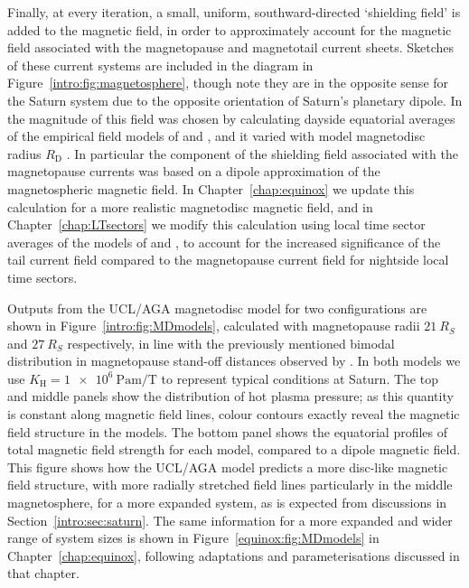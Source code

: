 Finally, at every iteration, a small, uniform, southward-directed `shielding field' is added to the magnetic field, in order to approximately account for the magnetic field associated with the magnetopause and magnetotail current sheets. Sketches of these current systems are included in the diagram in Figure~\ref{intro:fig:magnetosphere}, though note they are in the opposite sense for the Saturn system due to the opposite orientation of Saturn's planetary dipole. In \citet{achilleos2010a} the magnitude of this field was chosen by calculating dayside equatorial averages of the empirical field models of \citet{alexeev2005} and \citet{alexeev2006}, and it varied with model magnetodisc radius $R_\mathrm{D}$ \citep[see][Figure 6]{achilleos2010a}. In particular the component of the shielding field associated with the magnetopause currents was based on a dipole approximation of the magnetospheric magnetic field. In Chapter~\ref{chap:equinox} we update this calculation for a more realistic magnetodisc magnetic field, and in Chapter~\ref{chap:LTsectors} we modify this calculation using local time sector averages of the models of \citet{alexeev2005} and \citet{alexeev2006}, to account for the increased significance of the tail current field compared to the magnetopause current field for nightside local time sectors.

Outputs from the UCL/AGA magnetodisc model for two configurations are shown in Figure~\ref{intro:fig:MDmodels}, calculated with magnetopause radii $\SI{21}{R_S}$ and $\SI{27}{R_S}$ respectively, in line with the previously mentioned bimodal distribution in magnetopause stand-off distances observed by \citet{achilleos2008,pilkington2015}. In both models we use $K_\mathrm{H} = \SI{1e6}{\pascal\meter\per\tesla}$ to represent typical conditions at Saturn. The top and middle panels show the distribution of hot plasma pressure; as this quantity is constant along magnetic field lines, colour contours exactly reveal the magnetic field structure in the models. The bottom panel shows the equatorial profiles of total magnetic field strength for each model, compared to a dipole magnetic field. This figure shows how the UCL/AGA model predicts a more disc-like magnetic field structure, with more radially stretched field lines particularly in the middle magnetosphere, for a more expanded system, as is expected from discussions in Section~\ref{intro:sec:saturn}. The same information for a more expanded and wider range of system sizes is shown in Figure~\ref{equinox:fig:MDmodels} in Chapter~\ref{chap:equinox}, following adaptations and parameterisations discussed in that chapter.

